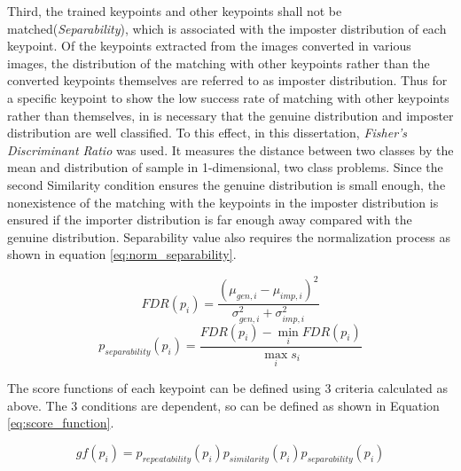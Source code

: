 Third, the trained keypoints and other keypoints shall not be matched(\textit{Separability}), which is associated with the imposter distribution of each keypoint. Of the keypoints extracted from the images converted in various images, the distribution of the matching with other keypoints rather than the converted keypoints themselves are referred to as imposter distribution. Thus for a specific keypoint to show the low success rate of matching with other keypoints rather than themselves, in is necessary that the genuine distribution and imposter distribution are well classified. To this effect, in this dissertation, \textit{Fisher's Discriminant Ratio\cite{fisher_use_1936}} was used. It measures the distance between two classes by the mean and distribution of sample in 1-dimensional, two class problems. Since the second Similarity condition ensures the genuine distribution is small enough, the nonexistence of the matching with the keypoints in the imposter distribution is ensured if the importer distribution is far enough away compared with the genuine distribution. Separability value also requires the normalization process as shown in equation \eqref{eq:norm_separability}.  


\begin{equation}
FDR(p_i) = \frac{(\mu_{gen,i} - \mu_{imp, i})^2}{\sigma_{gen, i}^2 + \sigma_{imp, i}^2}
\end{equation}
\begin{equation}\label{eq:norm_separability}
p_{separability}(p_i) = \frac{FDR(p_i) - \min_i {FDR(p_i)}}{\max_{i} {s_i}}
\end{equation}	


The score functions of each keypoint can be defined using 3 criteria calculated as above. The 3 conditions are dependent, so can be defined as shown in Equation \eqref{eq:score_function}. 

\begin{equation}\label{eq:score_function}
gf(p_i) = p_{repeatability}(p_i)p_{similarity}(p_i)p_{separability}(p_i)
\end{equation} 




